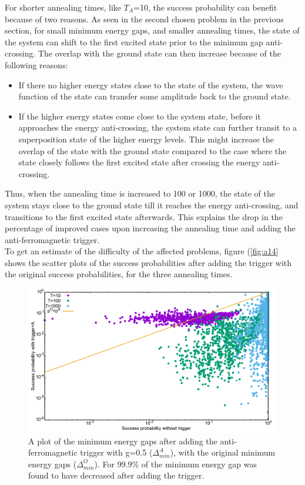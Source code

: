 \documentclass[12]{article}
\begin{document}
For shorter annealing times, like $T_A$=10, the success probability can benefit because of two reasons. As seen in the second chosen problem in the previous section, for small minimum energy gaps, and smaller annealing times, the state of the system can shift to the first excited state prior to the minimum gap anti-crossing. The overlap with the ground state can then increase because of the following reasons:
\begin{itemize}
\item If there no higher energy states close to the state of the system, the wave function of the state can transfer some amplitude back to the ground state.
\item If the higher energy states come close to the system state, before it approaches the energy anti-crossing, the system state can further transit to a superposition state of the higher energy levels. This might increase the overlap of the state with the ground state compared to the case where the state closely follows the first excited state after crossing the energy anti-crossing.
\end{itemize}

Thus, when the annealing time is increased to 100 or 1000, the state of the system stays close to the ground state till it reaches the energy anti-crossing, and transitions to the first excited state afterwards. This explains the drop in the percentage of improved cases upon increasing the annealing time and adding the anti-ferromagnetic trigger. \\

To get an estimate of the difficulty of the affected problems, figure (\ref{fig:a14} shows the scatter plots of the success probabilities after adding the trigger with the original success probabilities, for the three annealing times.

\begin{figure}[H]
\centering 
\includegraphics[scale=0.3]{ProbScat_g0.png}
\caption{A plot of the minimum energy gaps after adding the anti-ferromagnetic trigger with g=0.5 ($\Delta_{min}^A$), with the original minimum energy gaps ($\Delta_{min}^O$). For 99.9\% of the minimum energy gap was found to have decreased after adding the trigger.}
\label{fig:a13}
\end{figure}
\end{document}
